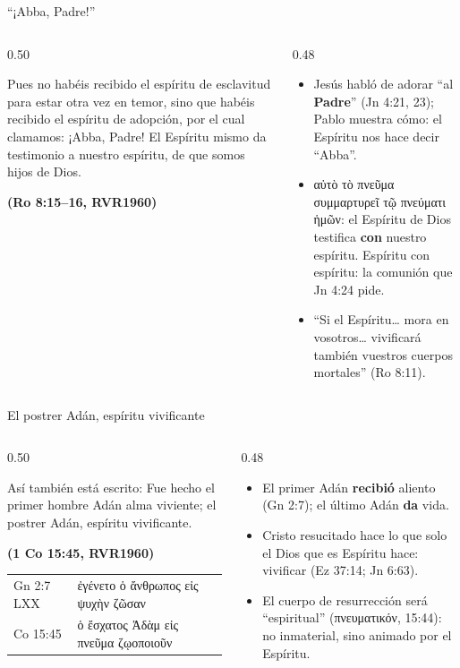 \documentclass[hyperref={bookmarks=false},aspectratio=169]{beamer}
\newcommand{\grc}[1]{\foreignlanguage{ancientgreek}{#1}}
\newcommand{\fuente}[1]{\par\hfill{\upshape\bfseries\footnotesize\textcolor{azul}{#1}}}
\newcommand{\destacar}[1]{\textbf{\textcolor{azul}{#1}}}
\begin{document}
\begin{frame}{``¡Abba, Padre!''}
\begin{columns}[t,onlytextwidth]
\begin{column}{0.50\textwidth}
\begin{cita}Pues no habéis recibido el espíritu de esclavitud para estar otra vez en temor, sino que habéis recibido el espíritu de adopción, por el cual clamamos: ¡Abba, Padre! El Espíritu mismo da testimonio a nuestro espíritu, de que somos hijos de Dios.\fuente{(Ro 8:15--16, RVR1960)}\end{cita}
\end{column}
\begin{column}{0.48\textwidth}\small
\begin{itemize}
\item Jesús habló de adorar ``al \destacar{Padre}'' (Jn 4:21, 23); Pablo muestra cómo: el Espíritu nos hace decir ``Abba''.
\item \grc{αὐτὸ τὸ πνεῦμα συμμαρτυρεῖ τῷ πνεύματι ἡμῶν}: el Espíritu de Dios testifica \destacar{con} nuestro espíritu. Espíritu con espíritu: la comunión que Jn 4:24 pide.
\item ``Si el Espíritu\ldots{} mora en vosotros\ldots{} vivificará también vuestros cuerpos mortales'' (Ro 8:11).
\end{itemize}
\end{column}
\end{columns}
\end{frame}

\begin{frame}{El postrer Adán, espíritu vivificante}
\begin{columns}[c,onlytextwidth]
\begin{column}{0.50\textwidth}
\begin{cita}Así también está escrito: Fue hecho el primer hombre Adán alma viviente; el postrer Adán, espíritu vivificante.\fuente{(1 Co 15:45, RVR1960)}\end{cita}
\scriptsize\renewcommand{\arraystretch}{1.12}
\begin{tabular}{@{}>{\RaggedRight\arraybackslash}p{1.7cm}>{\RaggedRight\arraybackslash}p{4.0cm}@{}}
\toprule
Gn 2:7 LXX & \grc{ἐγένετο ὁ ἄνθρωπος εἰς ψυχὴν ζῶσαν} \\
1 Co 15:45 & \grc{ὁ ἔσχατος Ἀδὰμ εἰς πνεῦμα ζῳοποιοῦν} \\
\bottomrule
\end{tabular}
\end{column}
\begin{column}{0.48\textwidth}\small
\begin{itemize}
\item El primer Adán \destacar{recibió} aliento (Gn 2:7); el último Adán \destacar{da} vida.
\item Cristo resucitado hace lo que solo el Dios que es Espíritu hace: vivificar (Ez 37:14; Jn 6:63).
\item El cuerpo de resurrección será ``espiritual'' (\grc{πνευματικόν}, 15:44): no inmaterial, sino animado por el Espíritu.
\end{itemize}
\end{column}
\end{columns}
\end{frame}
\end{document}
